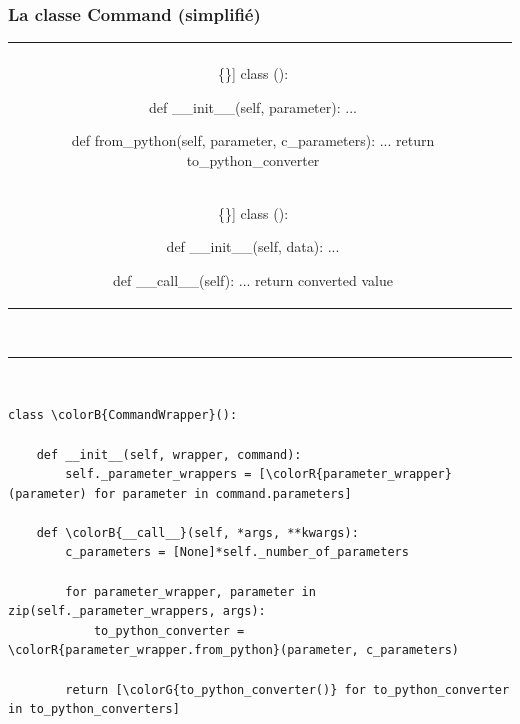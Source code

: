 \begin{frame}[fragile]
  \frametitle{La classe Command (simplifié)}
  {\tiny
    \begin{center}
      \begin{tabular}{c|c}
        \begin{minipage}[t]{.4\linewidth}
          \centerline{Python $\longrightarrow$ C}
          \vspace{1em}
\begin{Verbatim}[commandchars=\\\{\}]
class {ParameterWrapper}():

    def __init__(self, parameter):
        ...

    def from_python(self, parameter, c_parameters):
        ...
        return to_python_converter
\end{Verbatim}
      \end{minipage}
      &
      \begin{minipage}[t]{.25\linewidth}
        \centerline{C $\longrightarrow$ Python}
        \vspace{1em}
\begin{Verbatim}[commandchars=\\\{\}]
class {ToPythonConverter}():

    def __init__(self, data):
        ...

    def __call__(self):
        ...
        return converted value
\end{Verbatim}
      \end{minipage}
    \end{tabular}
    \\[1em]
    \rule{.8\textwidth}{.5pt}
    \\[1em]
    \begin{minipage}{.8\linewidth}
\begin{Verbatim}[commandchars=\\\{\}]
class \colorB{CommandWrapper}():

    def __init__(self, wrapper, command):
        self._parameter_wrappers = [\colorR{parameter_wrapper}(parameter) for parameter in command.parameters]

    def \colorB{__call__}(self, *args, **kwargs):
        c_parameters = [None]*self._number_of_parameters

        for parameter_wrapper, parameter in zip(self._parameter_wrappers, args):
            to_python_converter = \colorR{parameter_wrapper.from_python}(parameter, c_parameters)

        return [\colorG{to_python_converter()} for to_python_converter in to_python_converters]
\end{Verbatim}
    \end{minipage}
  \end{center}}
  \note{
    \begin{enumerate}
    \item 
    \end{enumerate}
  }
\end{frame}

